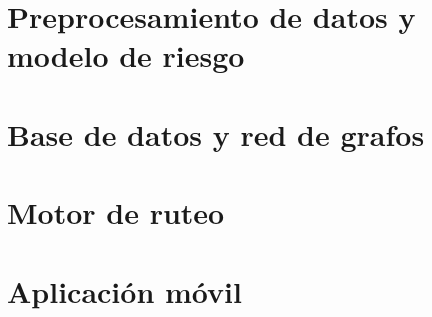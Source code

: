 
\section{Preprocesamiento de datos y modelo de riesgo}
\label{sec:impl_modelo_riesgo}


\section{Base de datos y red de grafos}
\label{sec:impl_base_datos}


\section{Motor de ruteo}
\label{sec:impl_motor_ruteo}


\section{Aplicación móvil}
\label{sec:impl_aplicacion_movil}

